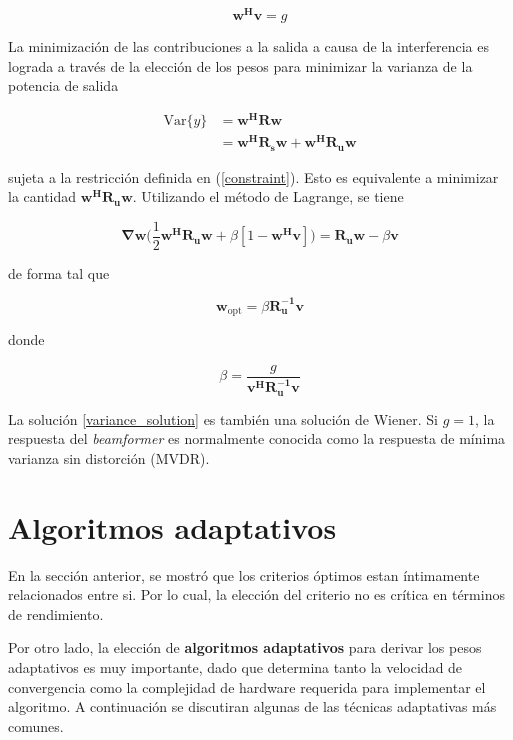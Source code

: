 \begin{equation}
\mathbf{w^H v} = g
\label{constraint}
\end{equation}

La minimización de las contribuciones a la salida a causa de la interferencia es lograda a través de la elección de los pesos para minimizar la varianza de la potencia de salida

\begin{align}
\text{Var}\{y\} &=  \mathbf{w^H R w} \\
                &=  \mathbf{w^H R_s w + w^H R_u w} \nonumber 
\end{align}

sujeta a la restricción definida en (\ref{constraint}). Esto es equivalente a minimizar la cantidad $\mathbf{w^H R_u w}$. Utilizando el método de Lagrange, se tiene

\begin{equation}
\mathbf{\nabla w}\Bigg(\frac{1}{2} \mathbf{w^H R_u w} + \beta [1 - \mathbf{w^H v}]\Bigg) = \mathbf{R_u w} - \beta \mathbf{v}
\end{equation}

de forma tal que

\begin{equation}
\mathbf{w}_\text{opt} = \beta \mathbf{R_u^{-1} v}
\label{variance_solution}
\end{equation}

donde

\begin{equation}
 \beta = \frac{g}{\mathbf{v^H R_u^{-1} v}}
\end{equation}

La solución \ref{variance_solution} es también una solución de Wiener. Si $g = 1$, la respuesta del \textit{beamformer} es normalmente conocida como la respuesta de mínima varianza sin distorción (MVDR).

\section{Algoritmos adaptativos}

En la sección anterior, se mostró que los criterios óptimos estan íntimamente relacionados entre si. Por lo cual, la elección del criterio no es crítica en términos de rendimiento.

Por otro lado, la elección de \textbf{algoritmos adaptativos} para derivar los pesos adaptativos es muy importante, dado que determina tanto la velocidad de convergencia como la complejidad de hardware requerida para implementar el algoritmo. A continuación se discutiran algunas de las técnicas adaptativas más comunes.

